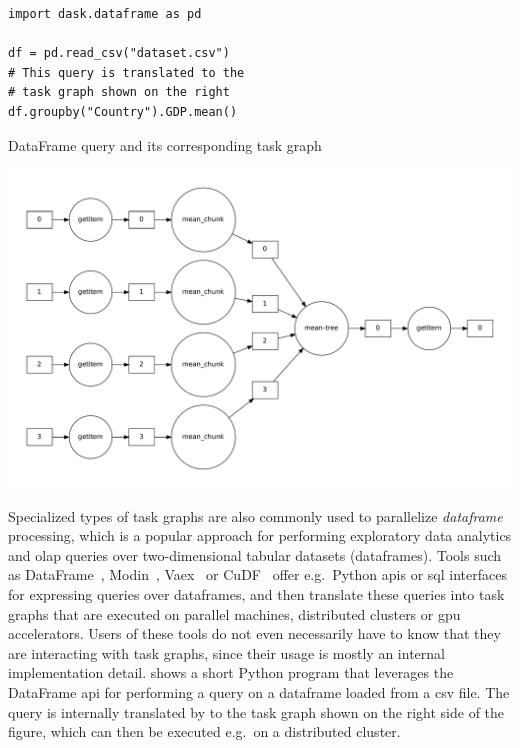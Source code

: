\begin{listing}[h]
	\begin{minipage}{.4\linewidth}
		\begin{verbatim}
import dask.dataframe as pd

df = pd.read_csv("dataset.csv")
# This query is translated to the
# task graph shown on the right
df.groupby("Country").GDP.mean()
	\end{verbatim}
		\caption{\dask{} DataFrame query and its corresponding task graph}
		\label{lst:dask-dataframe-example-1}
	\end{minipage}
	\begin{minipage}{.6\linewidth}
		\includegraphics[width=\linewidth]{imgs/dask-dataframe-1-graph}
	\end{minipage}
\end{listing}

Specialized types of task graphs are also commonly used to parallelize \emph{dataframe}
processing, which is a popular approach for performing exploratory data analytics and
\gls{olap} queries over two-dimensional tabular datasets (dataframes). Tools such as
\dask{} DataFrame~\cite{dask}, Modin~\cite{modin},
Vaex~\cite{vaex} or CuDF~\cite{cudf} offer e.g.\ Python
\glspl{api} or \gls{sql} interfaces for expressing queries over
dataframes, and then translate these queries into task graphs that are executed on parallel
machines, distributed clusters or \gls{gpu} accelerators. Users of these tools do not
even necessarily have to know that they are interacting with task graphs, since their usage is
mostly an internal implementation detail.  shows a short Python program that
leverages the \dask{} DataFrame \gls{api} for performing a query on a
dataframe loaded from a \gls{csv} file. The query is internally translated by
\dask{} to the task graph shown on the right side of the figure, which can then be
executed e.g.\ on a distributed cluster.

